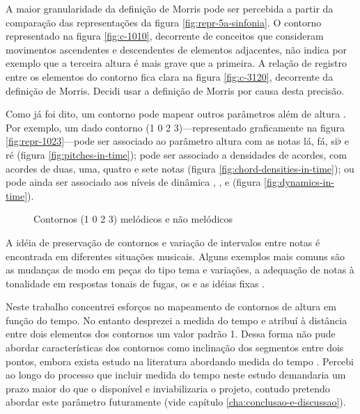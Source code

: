 A maior granularidade da definição de Morris pode ser percebida a
partir da comparação das representações da figura
\ref{fig:repr-5a-sinfonia}. O contorno representado na figura
\ref{fig:c-1010}, decorrente de conceitos que consideram movimentos
ascendentes e descendentes de elementos adjacentes, não indica por
exemplo que a terceira altura é mais grave que a primeira. A relação
de registro entre os elementos do contorno fica clara na figura
\ref{fig:c-3120}, decorrente da definição de Morris. Decidi usar a
definição de Morris por causa desta precisão.

Como já foi dito, um contorno pode mapear outros parâmetros além de
altura \cite[p. 206]{morris93:directions}
\cite[p. 22]{clifford95:contour}. Por exemplo, um dado contorno (1 0 2
3)---representado graficamente na figura \ref{fig:repr-1023}---pode
ser associado ao parâmetro altura com as notas lá, fá, si$\flat$ e ré
(figura \ref{fig:pitches-in-time}); pode ser associado a densidades de
acordes, com acordes de duas, uma, quatro e sete notas (figura
\ref{fig:chord-densities-in-time}); ou pode ainda ser associado aos
níveis de dinâmica , ,  e 
(figura \ref{fig:dynamics-in-time}).

\begin{figure}
  \centering

  \caption{Contornos (1 0 2 3) melódicos e não melódicos}
  \label{fig:non-melodic-contours}
\end{figure}

A idéia de preservação de contornos e variação de intervalos entre
notas é encontrada em diferentes situações musicais. Alguns exemplos
mais comuns são as mudanças de modo em peças do tipo tema e variações,
a adequação de notas à tonalidade em respostas tonais de fugas, os
 e as idéias fixas \cite[p. 29]{morris87:composition}.

Neste trabalho concentrei esforços no mapeamento de contornos de
altura em função do tempo. No entanto desprezei a medida do tempo e
atribuí à distância entre dois elementos dos contornos um valor padrão
1. Dessa forma não pude abordar características dos contornos como
inclinação dos segmentos entre dois pontos, embora exista estudo na
literatura abordando medida do tempo \cite{beard03:contour}. Percebi
ao longo do processo que incluir medida do tempo neste estudo
demandaria um prazo maior do que o disponível e inviabilizaria o
projeto, contudo pretendo abordar este parâmetro futuramente (vide
capítulo \ref{cha:conclusao-e-discussao}).

